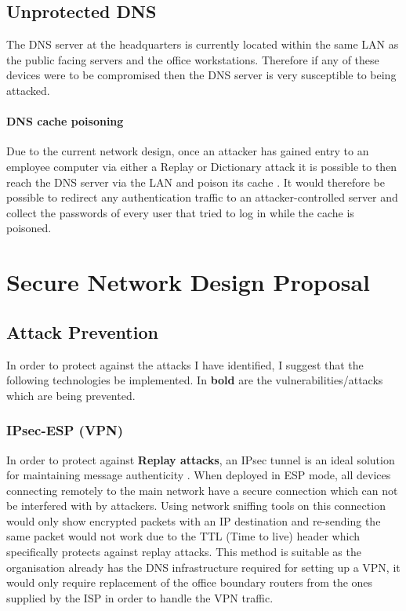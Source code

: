 \documentclass[11pt]{article}
\begin{document}
    \subsection{Unprotected DNS}
      The DNS server at the headquarters is currently located within the same LAN as the public facing servers and the office workstations. Therefore if any of these devices were to be compromised then the DNS server is very susceptible to being attacked.

      \paragraph{DNS cache poisoning}
        Due to the current network design, once an attacker has gained entry to an employee computer via either a Replay or Dictionary attack it is possible to then reach the DNS server via the LAN and poison its cache \citep{son2010hitchhiker}. It would therefore be possible to redirect any authentication traffic to an attacker-controlled server and collect the passwords of every user that tried to log in while the cache is poisoned.

    \section{Secure Network Design Proposal}
      \subsection{Attack Prevention}
        In order to protect against the attacks I have identified, I suggest that the following technologies be implemented. In \textbf{bold} are the vulnerabilities/attacks which are being prevented.

        \subsubsection{IPsec-ESP (VPN)} \label{ipsec}
          In order to protect against \textbf{Replay attacks}, an IPsec tunnel is an ideal solution for maintaining message authenticity \citep{ncsc2016IPSec}. When deployed in ESP mode, all devices connecting remotely to the main network have a secure connection which can not be interfered with by attackers. Using network sniffing tools on this connection would only show encrypted packets with an IP destination and re-sending the same packet would not work due to the TTL (Time to live) header which specifically protects against replay attacks. This method is suitable as the organisation already has the DNS infrastructure required for setting up a VPN, it would only require replacement of the office boundary routers from the ones supplied by the ISP in order to handle the VPN traffic.
\end{document}

